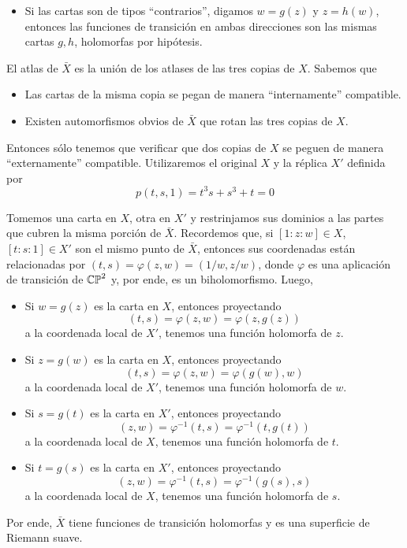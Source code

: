 \begin{solution}
\begin{enumerate}[label=\alph*)]
\begin{itemize}
        \item Si las cartas son de tipos ``contrarios'', digamos $w = g(z)$ y $z = h(w)$, entonces las funciones de transición en ambas direcciones son las mismas cartas $g, h$, holomorfas por hipótesis.
    \end{itemize}
    
    El atlas de $\bar X$ es la unión de los atlases de las tres copias de $X$. Sabemos que
    \begin{itemize}
        \item Las cartas de la misma copia se pegan de manera ``internamente'' compatible.
        \item Existen automorfismos obvios de $\bar X$ que rotan las tres copias de $X$.
    \end{itemize}
    
    Entonces sólo tenemos que verificar que dos copias de $X$ se peguen de manera ``externamente'' compatible. Utilizaremos el original $X$ y la réplica $X'$ definida por
    $$p(t, s, 1) = t^3 s + s^3 + t = 0$$
    
    Tomemos una carta en $X$, otra en $X'$ y restrinjamos sus dominios a las partes que cubren la misma porción de $\bar X$. Recordemos que, si $[1 : z : w] \in X$, $[t : s : 1] \in X'$ son el mismo punto de $\bar X$, entonces sus coordenadas están relacionadas por $(t, s) = \varphi(z, w) = (1/w, z/w)$, donde $\varphi$ es una aplicación de transición de $\mathbb {CP}^2$ y, por ende, es un biholomorfismo. Luego,
    \begin{itemize}
        \item Si $w = g(z)$ es la carta en $X$, entonces proyectando
        $$(t, s) = \varphi(z, w) = \varphi(z, g(z))$$
        a la coordenada local de $X'$, tenemos una función holomorfa de $z$.
        
        \item Si $z = g(w)$ es la carta en $X$, entonces proyectando
        $$(t, s) = \varphi(z, w) = \varphi(g(w), w)$$
        a la coordenada local de $X'$, tenemos una función holomorfa de $w$.
        
        \item Si $s = g(t)$ es la carta en $X'$, entonces proyectando
        $$(z, w) = \varphi^{-1}(t, s) = \varphi^{-1}(t, g(t))$$
        a la coordenada local de $X$, tenemos una función holomorfa de $t$.
        
        \item Si $t = g(s)$ es la carta en $X'$, entonces proyectando
        $$(z, w) = \varphi^{-1}(t, s) = \varphi^{-1}(g(s), s)$$
        a la coordenada local de $X$, tenemos una función holomorfa de $s$.
    \end{itemize}
    
    Por ende, $\bar X$ tiene funciones de transición holomorfas y es una superficie de Riemann suave.
\end{enumerate}
\end{solution}
